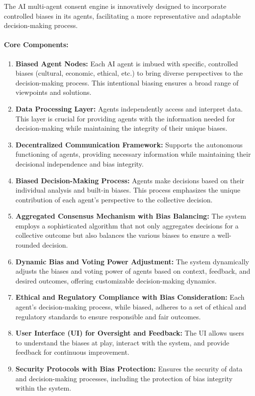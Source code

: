 \documentclass{article}
\begin{document}
The AI multi-agent consent engine is innovatively designed to
incorporate controlled biases in its agents, facilitating a more
representative and adaptable decision-making process.

\hypertarget{core-components}{%
\paragraph{Core Components:}\label{core-components}}

\begin{enumerate}
\def\labelenumi{\arabic{enumi}.}
\item
  \textbf{Biased Agent Nodes:} Each AI agent is imbued with specific,
  controlled biases (cultural, economic, ethical, etc.) to bring diverse
  perspectives to the decision-making process. This intentional biasing
  ensures a broad range of viewpoints and solutions.
\item
  \textbf{Data Processing Layer:} Agents independently access and
  interpret data. This layer is crucial for providing agents with the
  information needed for decision-making while maintaining the integrity
  of their unique biases.
\item
  \textbf{Decentralized Communication Framework:} Supports the
  autonomous functioning of agents, providing necessary information
  while maintaining their decisional independence and bias integrity.
\item
  \textbf{Biased Decision-Making Process:} Agents make decisions based
  on their individual analysis and built-in biases. This process
  emphasizes the unique contribution of each agent's perspective to the
  collective decision.
\item
  \textbf{Aggregated Consensus Mechanism with Bias Balancing:} The
  system employs a sophisticated algorithm that not only aggregates
  decisions for a collective outcome but also balances the various
  biases to ensure a well-rounded decision.
\item
  \textbf{Dynamic Bias and Voting Power Adjustment:} The system
  dynamically adjusts the biases and voting power of agents based on
  context, feedback, and desired outcomes, offering customizable
  decision-making dynamics.
\item
  \textbf{Ethical and Regulatory Compliance with Bias Consideration:}
  Each agent's decision-making process, while biased, adheres to a set
  of ethical and regulatory standards to ensure responsible and fair
  outcomes.
\item
  \textbf{User Interface (UI) for Oversight and Feedback:} The UI allows
  users to understand the biases at play, interact with the system, and
  provide feedback for continuous improvement.
\item
  \textbf{Security Protocols with Bias Protection:} Ensures the security
  of data and decision-making processes, including the protection of
  bias integrity within the system.
\end{enumerate}
\end{document}
